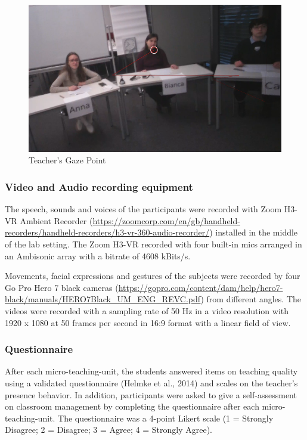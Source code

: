 \documentclass[
  man,floatsintext]{apa6}
\begin{document}
\begin{figure}

{\centering \includegraphics{./pictures/teachergazepoint} 

}

\caption{Teacher's Gaze Point}\label{fig:teachergazepoint}
\end{figure}

\hypertarget{video-and-audio-recording-equipment}{%
\subsubsection{Video and Audio recording equipment}\label{video-and-audio-recording-equipment}}

The speech, sounds and voices of the participants were recorded with Zoom H3-VR Ambient Recorder (\url{https://zoomcorp.com/en/gb/handheld-recorders/handheld-recorders/h3-vr-360-audio-recorder/}) installed in the middle of the lab setting. The Zoom H3-VR recorded with four built-in mics arranged in an Ambisonic array with a bitrate of 4608 kBits/s.

Movements, facial expressions and gestures of the subjects were recorded by four Go Pro Hero 7 black cameras (\url{https://gopro.com/content/dam/help/hero7-black/manuals/HERO7Black_UM_ENG_REVC.pdf}) from different angles. The videos were recorded with a sampling rate of 50 Hz in a video resolution with 1920 x 1080 at 50 frames per second in 16:9 format with a linear field of view.

\hypertarget{questionnaire}{%
\subsubsection{Questionnaire}\label{questionnaire}}

After each micro-teaching-unit, the students answered items on teaching quality using a validated questionnaire (Helmke et al., 2014) and scales on the teacher's presence behavior. In addition, participants were asked to give a self-assessment on classroom management by completing the questionnaire after each micro-teaching-unit. The questionnaire was a 4-point Likert scale (1 = Strongly Disagree; 2 = Disagree; 3 = Agree; 4 = Strongly Agree).
\end{document}
